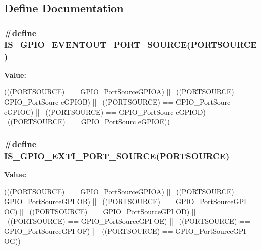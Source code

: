 \subsection{Define Documentation}
\hypertarget{group__GPIO__Port__Sources_ga40d86e5f9f013777038932f57bc6bbef}{
\subsubsection[{IS\_\-GPIO\_\-EVENTOUT\_\-PORT\_\-SOURCE}]{\setlength{\rightskip}{0pt plus 5cm}\#define IS\_\-GPIO\_\-EVENTOUT\_\-PORT\_\-SOURCE(PORTSOURCE)}}
\label{group__GPIO__Port__Sources_ga40d86e5f9f013777038932f57bc6bbef}
{\bfseries Value:}
\begin{DoxyCode}
(((PORTSOURCE) == GPIO_PortSourceGPIOA) || \
                                                  ((PORTSOURCE) == GPIO_PortSourc
      eGPIOB) || \
                                                  ((PORTSOURCE) == GPIO_PortSourc
      eGPIOC) || \
                                                  ((PORTSOURCE) == GPIO_PortSourc
      eGPIOD) || \
                                                  ((PORTSOURCE) == GPIO_PortSourc
      eGPIOE))
\end{DoxyCode}
\hypertarget{group__GPIO__Port__Sources_ga53c3a469f6b286da38bc198acf25e8f1}{
\subsubsection[{IS\_\-GPIO\_\-EXTI\_\-PORT\_\-SOURCE}]{\setlength{\rightskip}{0pt plus 5cm}\#define IS\_\-GPIO\_\-EXTI\_\-PORT\_\-SOURCE(PORTSOURCE)}}
\label{group__GPIO__Port__Sources_ga53c3a469f6b286da38bc198acf25e8f1}
{\bfseries Value:}
\begin{DoxyCode}
(((PORTSOURCE) == GPIO_PortSourceGPIOA) || \
                                              ((PORTSOURCE) == GPIO_PortSourceGPI
      OB) || \
                                              ((PORTSOURCE) == GPIO_PortSourceGPI
      OC) || \
                                              ((PORTSOURCE) == GPIO_PortSourceGPI
      OD) || \
                                              ((PORTSOURCE) == GPIO_PortSourceGPI
      OE) || \
                                              ((PORTSOURCE) == GPIO_PortSourceGPI
      OF) || \
                                              ((PORTSOURCE) == GPIO_PortSourceGPI
      OG))
\end{DoxyCode}
